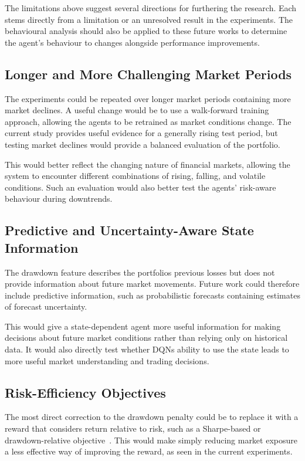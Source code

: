 The limitations above suggest several directions for furthering the
research. Each stems directly from a limitation or an unresolved result
in the experiments. The behavioural analysis should also be applied to
these future works to determine the agent's behaviour to changes
alongside performance improvements.

\subsection{Longer and More Challenging Market Periods}

The experiments could be repeated over longer market periods containing
more market declines. A useful change would be to use a walk-forward
training approach, allowing the agents to be retrained as market
conditions change. The current study provides useful evidence for a
generally rising test period, but testing market declines would provide
a balanced evaluation of the portfolio.

This would better reflect the changing nature of financial markets,
allowing the system to encounter different combinations of rising,
falling, and volatile conditions. Such an evaluation would also better
test the agents' risk-aware behaviour during downtrends.

\subsection{Predictive and Uncertainty-Aware State Information}

The drawdown feature describes the portfolio\textquotesingle s previous
losses but does not provide information about future market movements.
Future work could therefore include predictive information, such as
probabilistic forecasts containing estimates of forecast uncertainty.

This would give a state-dependent agent more useful information for
making decisions about future market conditions rather than relying only
on historical data. It would also directly test whether
DQN\textquotesingle s ability to use the state leads to more useful
market understanding and trading decisions.

\subsection{Risk-Efficiency Objectives}

The most direct correction to the drawdown penalty could be to replace
it with a reward that considers return relative to risk, such as a
Sharpe-based or drawdown-relative objective~\cite{moody2001}. This would make simply
reducing market exposure a less effective way of improving the reward,
as seen in the current experiments.

